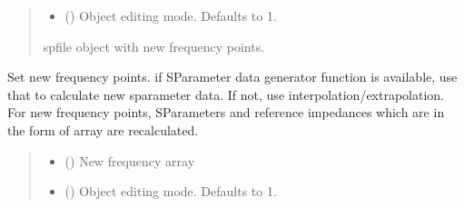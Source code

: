 \documentclass[letterpaper,10pt,english]{sphinxmanual}
\begin{document}
\begin{fulllineitems}
\begin{fulllineitems}
\begin{quote}
\begin{description}
\begin{itemize}
\item {}
\sphinxAtStartPar
{} (\sphinxstyleliteralemphasis{\sphinxupquote{, }}) \textendash{} Object editing mode. Defaults to \sphinxhyphen{}1.

\end{itemize}

\sphinxAtStartPar
spfile object with new frequency points.

\sphinxAtStartPar
{\hyperref[\detokenize{touchstone:touchstone.spfile}]{}}

\end{description}\end{quote}

\end{fulllineitems}


\begin{fulllineitems}
\label{\detokenize{touchstone:touchstone.spfile.set_frequency_points}}
\pysigstartsignatures
{}
\pysigstopsignatures
\sphinxAtStartPar
Set new frequency points. if S\sphinxhyphen{}Parameter data generator function is
available, use that to calculate new s\sphinxhyphen{}parameter data. If not, use
interpolation/extrapolation. For new frequency points, S\sphinxhyphen{}Parameters
and reference impedances which are in the form of array are re\sphinxhyphen{}calculated.
\begin{quote}\begin{description}
\begin{itemize}
\item {}
\sphinxAtStartPar
{} () \textendash{} New frequency array

\item {}
\sphinxAtStartPar
{} (\sphinxstyleliteralemphasis{\sphinxupquote{, }}) \textendash{} Object editing mode. Defaults to \sphinxhyphen{}1.


\end{itemize}
\end{description}
\end{quote}
\end{fulllineitems}
\end{fulllineitems}
\end{document}
